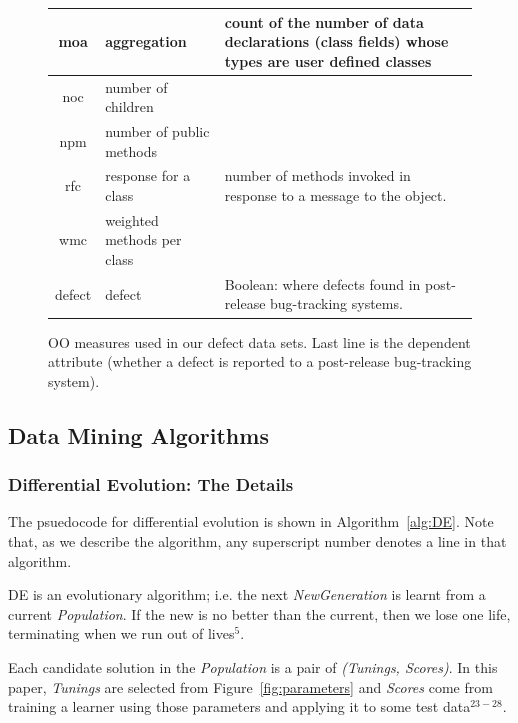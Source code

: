 \documentclass{sig-alternative}
\newcommand{\fig}[1]{Figure~\ref{fig:#1}}
\begin{document}
\begin{figure}[!t]
\begin{center}
{\begin{tabular}{c|l|p{4in}}
moa &  aggregation &  count of the number of data declarations (class
fields) whose types are user defined classes\\\hline
noc &  number of children &\\\hline
npm & number of public methods & \\\hline
rfc & response for a class &number of  methods invoked in response to
a message to the object.\\\hline
wmc & weighted methods per class &\\\hline
\rowcolor{lightgray}
defect & defect & Boolean: where defects found in post-release bug-tracking systems.
\end{tabular}
}
\end{center}
\caption{OO measures used in our defect data sets.  Last line is
the dependent attribute (whether a defect is reported to  a
post-release bug-tracking system).}\label{fig:ck}
\end{figure}




 

\subsection{Data Mining Algorithms}
 


\subsubsection{Differential Evolution: The Details}
 
 

The psuedocode for differential evolution is shown in Algorithm~\ref{alg:DE}.
Note that, as we describe the algorithm,
  any superscript number denotes a line in that algorithm.


DE is an evolutionary algorithm; i.e. the next {\em NewGeneration} is learnt from
a current {\em Population}.  If the new is no better than the current, then
we lose one life, terminating when we run out of lives$^5$.

Each candidate solution in the {\em Population}  
is a pair of {\em (Tunings, Scores)}. In this paper, {\em Tunings} are selected from
\fig{parameters} and {\em Scores} come from training a learner using those parameters
and applying it to some test data$^{23-28}$.
\end{document}
